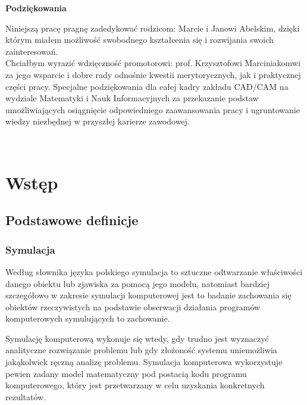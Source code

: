 \documentclass[12pt, twoside, openany]{report}
\theoremstyle{definition}
\begin{document}
\newpage
\pagestyle{empty}
\vspace*{\fill}
\begin{center}
\LARGE\textbf{Podziękowania}\\
\end{center}
Niniejszą pracę pragnę zadedykować rodzicom: Marcie i Janowi Abelskim, dzięki którym miałem możliwość swobodnego kształcenia się i rozwijania swoich zainteresowań.
\vspace{10px}
\\
Chciałbym wyrazić wdzięczność promotorowi: prof. Krzysztofowi Marciniakomwi za jego wsparcie i dobre rady odnośnie kwestii merytorycznych, jak i praktycznej części pracy. Specjalne podziękowania dla całej kadry zakładu CAD/CAM na wydziale Matematyki i Nauk Informacyjnych za przekazanie podstaw umożliwiających osiągnięcie odpowiedniego zaawansowania pracy i ugruntowanie wiedzy niezbędnej w przyszłej karierze zawodowej.

\vspace{\fill}

\newpage
\pagestyle{empty}
$ $
\newpage

\newpage
\pagestyle{plain}
\setcounter{page}{11}
\tableofcontents

\newpage
\pagestyle{headings}

\renewcommand*{\arraystretch}{1.5}

\chapter{Wstęp}
\section{Podstawowe definicje}
\subsection{Symulacja}
Według słownika języka polskiego \cite{PWNSymulacja} symulacja to sztuczne odtwarzanie właściwości danego obiektu lub zjawiska za pomocą jego modelu, natomiast bardziej szczegółowo w zakresie symulacji komputerowej jest to badanie zachowania się obiektów rzeczywistych na podstawie obserwacji działania programów komputerowych symulujących to zachowanie.


Symulację komputerową wykonuje się wtedy, gdy trudno jest wyznaczyć analityczne rozwiązanie problemu lub gdy złożoność systemu uniemożliwia jakąkolwiek ręczną analizę problemu. Symulacja komputerowa wykorzystuje pewien zadany model matematyczny pod postacią kodu programu komputerowego, który jest przetwarzany w celu uzyskania konkretnych rezultatów.
\end{document}
